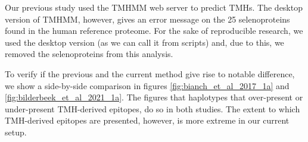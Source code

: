 
Our previous study used the TMHMM web server
to predict TMHs.
The desktop version of TMHMM, however, gives an
error message on the 25 selenoproteins found in the human
reference proteome.
For the sake of reproducible research, we used the desktop version (as
we can call it from scripts) and, due to this, we removed the
selenoproteins from this analysis.


To verify if the previous and the current method give rise to
notable difference, we show a side-by-side comparison
in figures \ref{fig:bianch_et_al_2017_1a} and \ref{fig:bilderbeek_et_al_2021_1a}.
The figures that haplotypes that over-present or under-present TMH-derived epitopes,
do so in both studies. The extent to which TMH-derived epitopes are
presented, however, is more extreme in our current setup.

